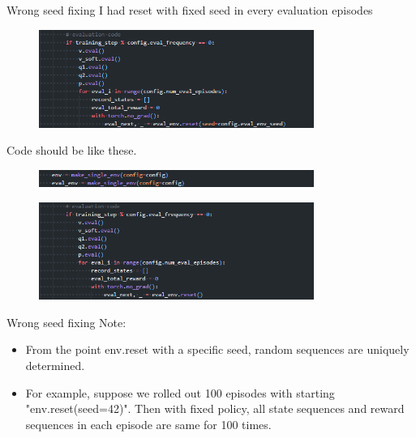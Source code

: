 \documentclass[8pt]{beamer}
\begin{document}
\begin{frame}{Wrong seed fixing}
    I had reset with fixed seed in every evaluation episodes
    \begin{figure}
        \includegraphics[width=0.8\textwidth]{WrongEvalSeed}
    \end{figure}

    Code should be like these.
    \begin{figure}
        \includegraphics[width=0.8\textwidth]{FixEvalSeedFix1.png}
    \end{figure}    
    \begin{figure}
        \includegraphics[width=0.8\textwidth]{FixEvalSeedFix2.png}
    \end{figure}
\end{frame}

\begin{frame}{Wrong seed fixing}
    Note:
    \begin{itemize}
        \item From the point env.reset with a specific seed, random sequences are uniquely determined.
        \item For example, suppose we rolled out 100 episodes with starting "env.reset(seed=42)". Then with fixed policy, all state sequences and reward sequences in each episode are same for 100 times.
    \end{itemize}
\end{frame}
\end{document}
